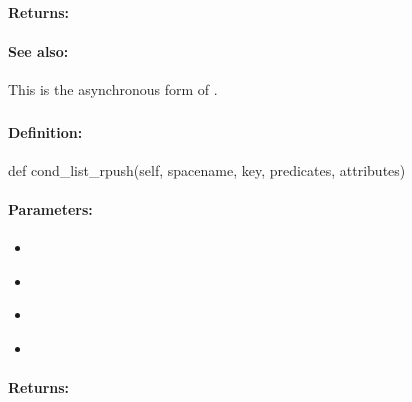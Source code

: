 \paragraph{Returns:}


\paragraph{See also:}  This is the asynchronous form of .

\pagebreak
\subsubsection{}
\label{api:python:cond_list_rpush}


\paragraph{Definition:}
\begin{pythoncode}
def cond_list_rpush(self, spacename, key, predicates, attributes)
\end{pythoncode}

\paragraph{Parameters:}
\begin{itemize}[noitemsep]
\item {}\\

\item {}\\

\item {}\\

\item {}\\

\end{itemize}

\paragraph{Returns:}


